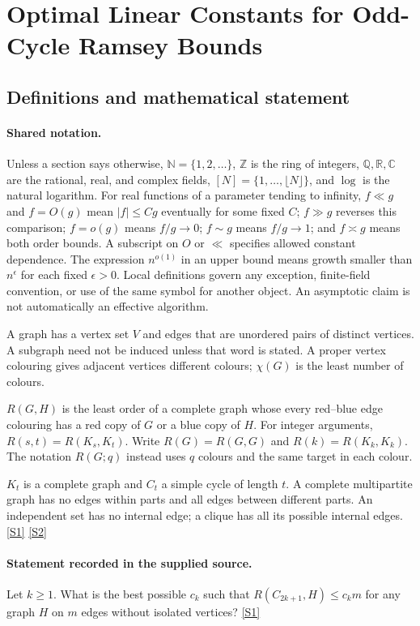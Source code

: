 \documentclass[11pt,a4paper]{article}
\newcommand{\N}{\mathbb{N}}
\newcommand{\Z}{\mathbb{Z}}
\newcommand{\Q}{\mathbb{Q}}
\newcommand{\R}{\mathbb{R}}
\newcommand{\C}{\mathbb{C}}
\newcommand{\sref}[2]{\hyperlink{source:#1:#2}{[S#2]}}
\begin{document}
\section{Optimal Linear Constants for Odd-Cycle Ramsey Bounds}\label{statement}


\subsection{Definitions and mathematical statement}

\paragraph{Shared notation.}Unless a section says otherwise, $\N=\{1,2,\ldots\}$,
$\Z$ is the ring of integers, $\Q,\R,\C$ are the rational, real, and complex
fields, $[N]=\{1,\ldots,\lfloor N\rfloor\}$, and $\log$ is the natural
logarithm. For real functions of a parameter tending to infinity,
$f\ll g$ and $f=O(g)$ mean $|f|\leq Cg$ eventually for some fixed $C$;
$f\gg g$ reverses this comparison; $f=o(g)$ means $f/g\to0$;
$f\sim g$ means $f/g\to1$; and $f\asymp g$ means both order bounds.
A subscript on $O$ or $\ll$ specifies allowed constant dependence.
The expression $n^{o(1)}$ in an upper bound means growth smaller than
$n^\epsilon$ for each fixed $\epsilon>0$. Local definitions govern any
exception, finite-field convention, or use of the same symbol for another
object. An asymptotic claim is not automatically an effective algorithm.



A graph has a vertex set $V$ and edges that are unordered pairs of distinct vertices. A subgraph need not be induced unless that word is stated. A proper vertex colouring gives adjacent vertices different colours; $\chi(G)$ is the least number of colours.

$R(G,H)$ is the least order of a complete graph whose every red--blue edge colouring has a red copy of $G$ or a blue copy of $H$. For integer arguments, $R(s,t)=R(K_s,K_t)$. Write $R(G)=R(G,G)$ and $R(k)=R(K_k,K_k)$. The notation $R(G;q)$ instead uses $q$ colours and the same target in each colour.

$K_t$ is a complete graph and $C_t$ a simple cycle of length $t$. A complete multipartite graph has no edges within parts and all edges between different parts. An independent set has no internal edge; a clique has all its possible internal edges. \sref{statement}{1} \sref{statement}{2}

\paragraph{Statement recorded in the supplied source.}
Let $k\geq 1$. What is the best possible $c_k$ such that $ R(C_{2k+1},H)\leq c_k m $ for any graph $H$ on $m$ edges without isolated vertices? \sref{statement}{1}
\end{document}
